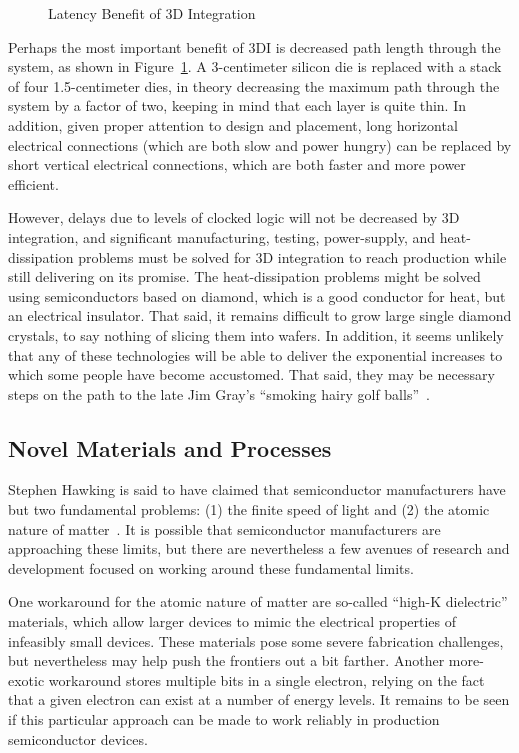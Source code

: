 \begin{figure}[tb]
\centering
{}
\caption{Latency Benefit of 3D Integration}
\label{fig:cpu:Latency Benefit of 3D Integration}
\end{figure}

Perhaps the most important benefit of 3DI is decreased path length through
the system, as shown in
Figure~\ref{fig:cpu:Latency Benefit of 3D Integration}.
A 3-centimeter silicon die is replaced with a stack of four 1.5-centimeter
dies, in theory decreasing the maximum path through the system by a factor
of two, keeping in mind that each layer is quite thin.
In addition, given proper attention to design and placement,
long horizontal electrical connections (which are both slow and
power hungry) can be replaced by short vertical electrical connections,
which are both faster and more power efficient.

However, delays due to levels of clocked logic will not be decreased
by 3D integration, and significant manufacturing, testing, power-supply,
and heat-dissipation problems must be solved for 3D integration to
reach production while still delivering on its promise.
The heat-dissipation problems might be solved using
semiconductors based on diamond, which is a good conductor
for heat, but an electrical insulator.
That said, it remains difficult to grow large single diamond crystals,
to say nothing of slicing them into wafers.
In addition, it seems unlikely that any of these technologies will be able to
deliver the exponential increases to which some people have become accustomed.
That said, they may be necessary steps on the path to the late Jim Gray's
``smoking hairy golf balls''~\cite{JimGray2002SmokingHairyGolfBalls}.

\subsection{Novel Materials and Processes}
\label{sec:cpu:Novel Materials and Processes}

Stephen Hawking is said to have claimed that semiconductor manufacturers
have but two fundamental problems: (1) the finite speed of light and
(2) the atomic nature of matter~\cite{BryanGardiner2007}.
It is possible that semiconductor manufacturers are approaching these
limits, but there are nevertheless a few avenues of research and
development focused on working around these fundamental limits.

One workaround for the atomic nature of matter are so-called
``high-K dielectric'' materials, which allow larger devices to mimic the
electrical properties of infeasibly small devices.
These materials pose some severe fabrication challenges, but nevertheless
may help push the frontiers out a bit farther.
Another more-exotic workaround stores multiple bits in a single electron,
relying on the fact that a given electron can exist at a number of
energy levels.
It remains to be seen if this particular approach can be made to work
reliably in production semiconductor devices.


